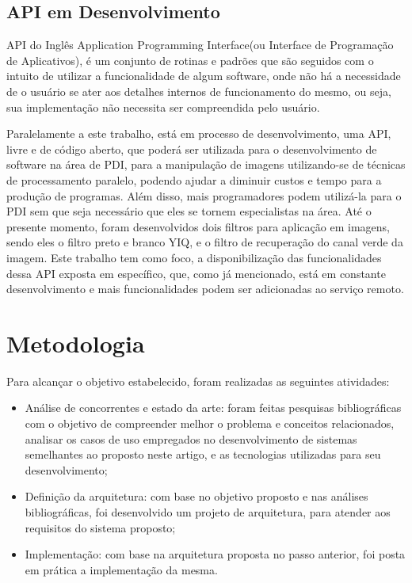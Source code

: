 \documentclass[12pt]{article}
\begin{document}
\subsection{API em Desenvolvimento}

API do Inglês Application Programming Interface(ou Interface de Programação de Aplicativos), é um conjunto de rotinas e padrões que são seguidos com o intuito de utilizar a funcionalidade de algum software, onde não há a necessidade de o usuário se ater aos detalhes internos de funcionamento do mesmo, ou seja, sua implementação não necessita ser compreendida pelo usuário. 

Paralelamente a este trabalho, está em processo de desenvolvimento, uma API, livre e de código aberto, que poderá ser utilizada para o desenvolvimento de software na área de PDI, para a manipulação de imagens utilizando-se de técnicas de processamento paralelo, podendo ajudar a diminuir custos e tempo para a produção de programas. Além disso, mais programadores podem utilizá-la para o PDI sem que seja necessário que eles se tornem especialistas na área.
Até o presente momento, foram desenvolvidos dois filtros para aplicação em imagens, sendo eles o filtro preto e branco YIQ, e o filtro de recuperação do canal verde da imagem. Este trabalho tem como foco, a disponibilização das funcionalidades dessa API exposta em específico, que, como já mencionado, está em constante desenvolvimento e mais funcionalidades podem ser adicionadas ao serviço remoto.

\section{Metodologia}

Para alcançar o objetivo estabelecido, foram realizadas as seguintes atividades:
\begin{itemize}
	\item Análise de concorrentes e estado da arte: foram feitas pesquisas bibliográficas com o objetivo de compreender melhor o problema e conceitos relacionados, analisar os casos de uso empregados no desenvolvimento de sistemas semelhantes ao proposto neste artigo, e as tecnologias utilizadas para seu desenvolvimento;
	\item Definição da arquitetura: com base no objetivo proposto e nas análises bibliográficas, foi desenvolvido um projeto de arquitetura, para atender aos requisitos do sistema proposto;
	\item Implementação: com base na arquitetura proposta no passo anterior, foi posta em prática a implementação da mesma.
\end{itemize}
\end{document}
